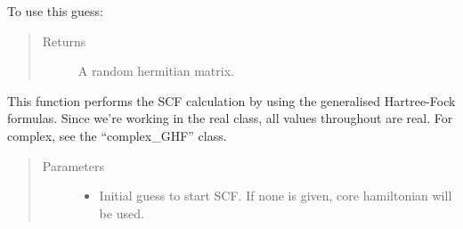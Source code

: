 \documentclass[letterpaper,10pt,english]{sphinxmanual}
\begin{document}
\begin{fulllineitems}
\begin{fulllineitems}
To use this guess:

\begin{sphinxVerbatim}[commandchars=\\\{\}]
          
   
  
\end{sphinxVerbatim}
\begin{quote}\begin{description}
\item[{Returns}] \leavevmode
A random hermitian matrix.

\end{description}\end{quote}

\end{fulllineitems}


\begin{fulllineitems}
\label{\detokenize{GHF:hf.GHF.GHF.scf}}
This function performs the SCF calculation by using the generalised Hartree-Fock formulas. Since we’re working
in the real class, all values throughout are real. For complex, see the “complex\_GHF” class.
\begin{quote}\begin{description}
\item[{Parameters}] \leavevmode\begin{itemize}
\item {} 
 \textendash{} Initial guess to start SCF. If none is given, core hamiltonian will be used.


\end{itemize}
\end{description}
\end{quote}
\end{fulllineitems}
\end{fulllineitems}
\end{document}
